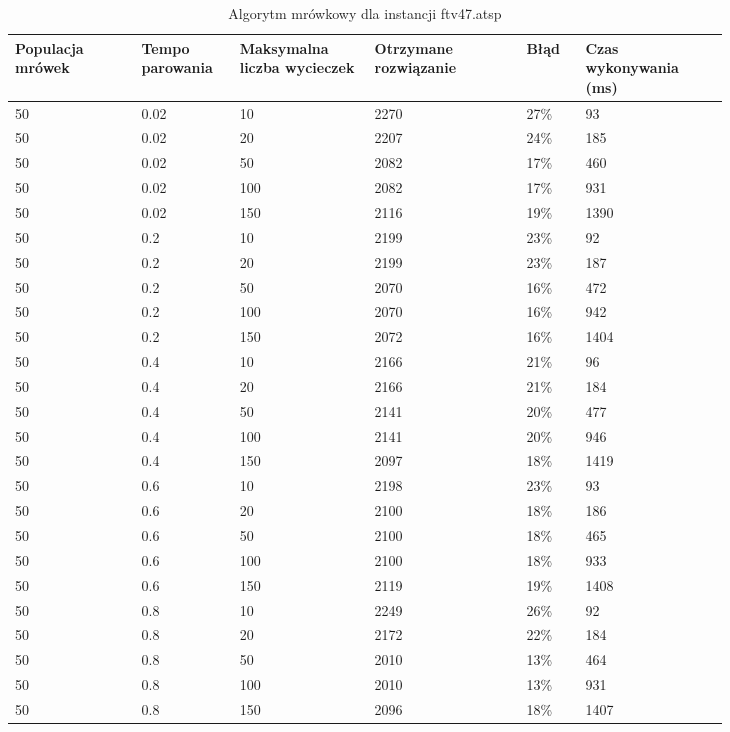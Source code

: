 \documentclass[12pt,a4paper,titlepage]{article}
\begin{document}
\begin{table}[H]
	\caption{Algorytm mrówkowy dla instancji ftv47.atsp}
    \centering
	\begin{tabular}{|p{0.15\linewidth}|p{0.10\linewidth}|p{0.16\linewidth}|p{0.18\linewidth}|p{0.07\linewidth}|p{0.17\linewidth}|}
		\hline
        Populacja mrówek & Tempo parowania & Maksymalna liczba \newline wycieczek & Otrzymane rozwiązanie & Błąd & Czas \newline wykonywania (ms) \\
		\hline
        50 & 0.02 & 10 & 2270 & 27\% & 93 \\
        50 & 0.02 & 20 & 2207 & 24\% & 185 \\
        50 & 0.02 & 50 & 2082 & 17\% & 460 \\
        50 & 0.02 & 100 & 2082 & 17\% & 931 \\
        50 & 0.02 & 150 & 2116 & 19\% & 1390 \\
        \hline
        50 & 0.2 & 10 & 2199 & 23\% & 92 \\
        50 & 0.2 & 20 & 2199 & 23\% & 187 \\
        50 & 0.2 & 50 & 2070 & 16\% & 472 \\
        50 & 0.2 & 100 & 2070 & 16\% & 942 \\
        50 & 0.2 & 150 & 2072 & 16\% & 1404 \\
        \hline
        50 & 0.4 & 10 & 2166 & 21\% & 96 \\
        50 & 0.4 & 20 & 2166 & 21\% & 184 \\
        50 & 0.4 & 50 & 2141 & 20\% & 477 \\
        50 & 0.4 & 100 & 2141 & 20\% & 946 \\
        50 & 0.4 & 150 & 2097 & 18\% & 1419 \\
        \hline
        50 & 0.6 & 10 & 2198 & 23\% & 93 \\
        50 & 0.6 & 20 & 2100 & 18\% & 186 \\
        50 & 0.6 & 50 & 2100 & 18\% & 465 \\
        50 & 0.6 & 100 & 2100 & 18\% & 933 \\
        50 & 0.6 & 150 & 2119 & 19\% & 1408 \\
        \hline
        50 & 0.8 & 10 & 2249 & 26\% & 92 \\
        50 & 0.8 & 20 & 2172 & 22\% & 184 \\
        50 & 0.8 & 50 & 2010 & 13\% & 464 \\
        50 & 0.8 & 100 & 2010 & 13\% & 931 \\
        50 & 0.8 & 150 & 2096 & 18\% & 1407 \\
        \hline
    \end{tabular}
\end{table}
\end{document}
